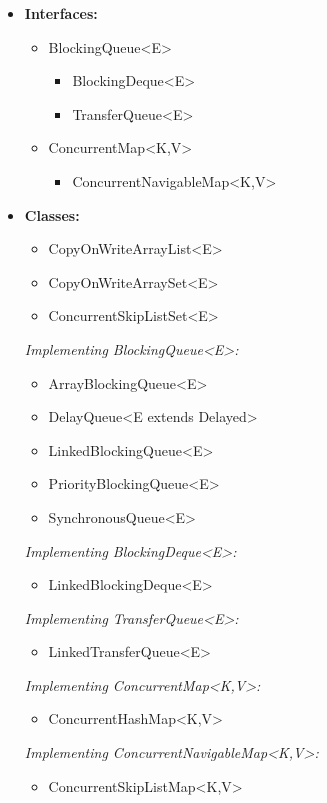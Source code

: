 \documentclass[]{usiinfthesis}
\begin{document}
\begin{itemize}
    \item \textbf{Interfaces:}
    \begin{itemize}
        \item BlockingQueue<E>
        \begin{itemize}
            \item BlockingDeque<E>
            \item TransferQueue<E>
        \end{itemize}
        \item ConcurrentMap<K,V>
        \begin{itemize}
            \item ConcurrentNavigableMap<K,V>
        \end{itemize}
    \end{itemize}
    \item \textbf{Classes:}
    \begin{itemize}
        \item CopyOnWriteArrayList<E>
        \item CopyOnWriteArraySet<E>
        \item ConcurrentSkipListSet<E>
    \end{itemize}
    \textit{Implementing BlockingQueue<E>:}
    \begin{itemize}
        \item ArrayBlockingQueue<E>
        \item DelayQueue<E extends Delayed>
        \item LinkedBlockingQueue<E>
        \item PriorityBlockingQueue<E>
        \item SynchronousQueue<E>
    \end{itemize}
    \textit{Implementing BlockingDeque<E>:}
    \begin{itemize}
        \item LinkedBlockingDeque<E>
    \end{itemize}
    \textit{Implementing TransferQueue<E>:}
    \begin{itemize}
        \item LinkedTransferQueue<E>
    \end{itemize}
    \textit{Implementing ConcurrentMap<K,V>:}
    \begin{itemize}
        \item ConcurrentHashMap<K,V>
    \end{itemize}
    \textit{Implementing ConcurrentNavigableMap<K,V>:}
    \begin{itemize}
        \item ConcurrentSkipListMap<K,V>
    \end{itemize}
\end{itemize}
\end{document}
